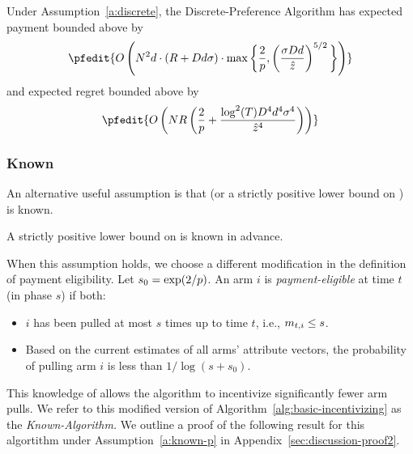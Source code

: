 \begin{theorem}
\label{rst:discrete}
Under Assumption~\ref{a:discrete}, the Discrete-Preference Algorithm has expected payment  bounded above by 
\begin{align*}
\pfedit{
O \left(\ARMNUM^2  d \cdot (\MAXR + \Diam d \sigma)\cdot
    \max\bigg\{\frac{2}{p},
    \left( \frac{\sigma \Diam d}{\TieCutoff} \right)^{5/2}
    \bigg\}
\right)
}
\end{align*}
and expected regret bounded above by 
\begin{align}
\pfedit{
O \left(
\ARMNUM \MAXR \left(
	\frac2{\MinProb}
       + \frac{\log^2(T) \Diam^4 d^4 \sigma^4}{\hat{z}^4}\right) \right)
}
\end{align}
\end{theorem}



\subsubsection{Known \MinProb}
An alternative useful assumption is that \MinProb (or a strictly positive lower bound on \MinProb) is known.

\begin{assumption}
\label{a:known-p}
A strictly positive lower bound on \MinProb is known in advance.
\end{assumption}

When this assumption holds, we choose a different modification in the definition of payment eligibility.
Let $s_0 = \exp(2/p)$.
An arm $i$ is \emph{payment-eligible} at time $t$ (in phase $s$)
if both: 
\begin{itemize}
\item $i$ has been pulled at most
$s$ times up to time $t$, i.e., $m_{t,i} \leq s$.
\item Based on the current estimates  of all arms' attribute vectors, the probability of pulling arm $i$ is less than $1/\log(s+s_0)$.
\end{itemize}

This knowledge of \MinProb allows the algorithm to incentivize
significantly fewer arm pulls.
We refer to this modified version of Algorithm~\ref{alg:basic-incentivizing} as the \emph{Known-\MinProb Algorithm.}
We outline a proof of the following result for this algortithm under Assumption~\ref{a:known-p} in Appendix~\ref{sec:discussion-proof2}.

